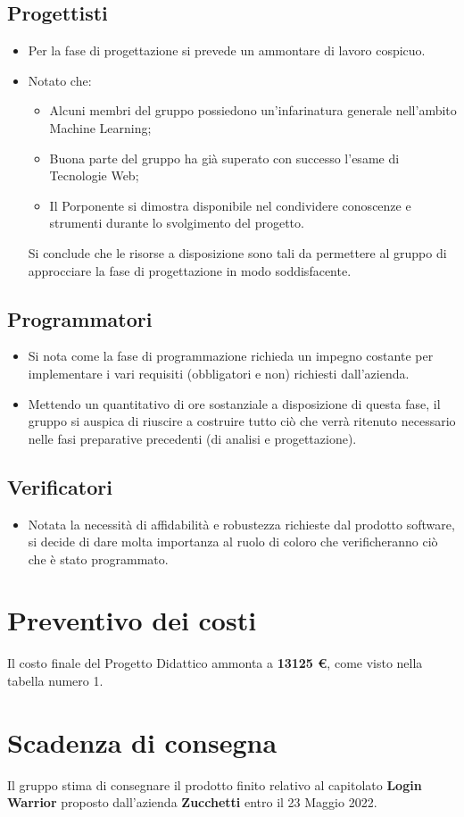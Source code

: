 \documentclass[11pt]{article}
\begin{document}
\subsection{Progettisti}
    \begin{itemize}
        \item Per la fase di progettazione si prevede un ammontare di lavoro cospicuo.
        \item Notato che:
            \begin{itemize}
                \item Alcuni membri del gruppo possiedono un'infarinatura generale nell'ambito Machine Learning;
                \item Buona parte del gruppo ha già superato con successo l'esame di Tecnologie Web;
                \item Il Porponente si dimostra disponibile nel condividere conoscenze e strumenti durante lo svolgimento del progetto.
            \end{itemize}
        Si conclude che le risorse a disposizione sono tali da permettere al gruppo di approcciare la fase di progettazione in modo soddisfacente.
    \end{itemize}
\subsection{Programmatori}
    \begin{itemize}
        \item Si nota come la fase di programmazione richieda un impegno costante per implementare i vari requisiti (obbligatori e non) richiesti dall'azienda.
        \item Mettendo un quantitativo di ore sostanziale a disposizione di questa fase, il gruppo si auspica di riuscire a costruire tutto ciò che verrà ritenuto necessario nelle fasi preparative precedenti (di analisi e progettazione).
    \end{itemize}
\subsection{Verificatori}
    \begin{itemize}
        \item Notata la necessità di affidabilità e robustezza richieste dal prodotto software, si decide di dare molta importanza al ruolo di coloro che verificheranno ciò che è stato programmato.
    \end{itemize}
\section{Preventivo dei costi}
Il costo finale del Progetto Didattico ammonta a \textbf{13125 \euro}, come visto nella tabella numero 1.
\section{Scadenza di consegna}
Il gruppo stima di consegnare il prodotto finito relativo al capitolato 
\textbf{Login Warrior} proposto dall'azienda 
\textbf{Zucchetti} entro il 23 Maggio 2022. 
\end{document}
